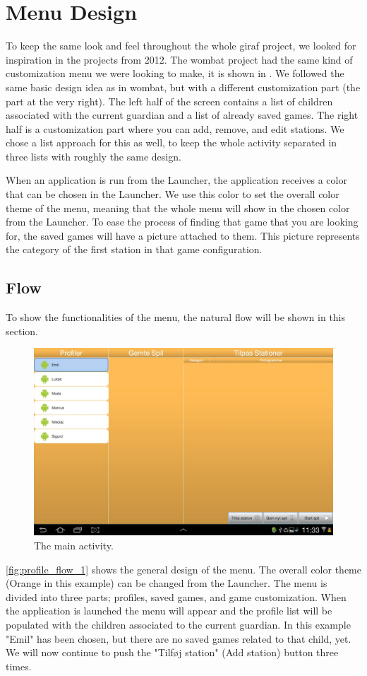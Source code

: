 \section{Menu Design}
\label{designmenu}
To keep the same look and feel throughout the whole \ac{giraf} project, we looked for inspiration in the projects from 2012. The \ac{wombat} project had the same kind of customization menu we were looking to make, it is shown in . We followed the same basic design idea as in \ac{wombat}, but with a different customization part (the part at the very right). The left half of the screen contains a list of children associated with the current guardian and a list of already saved games. The right half is a customization part where you can add, remove, and edit stations. We chose a list approach for this as well, to keep the whole activity separated in three lists with roughly the same design.

When an application is run from the Launcher, the application receives a color that can be chosen in the Launcher. We use this color to set the overall color theme of the menu, meaning that the whole menu will show in the chosen color from the Launcher.
To ease the process of finding that game that you are looking for, the saved games will have a picture attached to them. This picture represents the category of the first station in that game configuration.

\subsection{Flow}
To show the functionalities of the menu, the natural flow will be shown in this section.
\begin{figure}[H]
\centering
\includegraphics[width=1.0\linewidth]{img/screenshots/profile_flow_1.jpg}%
\caption{The main activity.}
\label{fig:profile_flow_1}
\end{figure}
\autoref{fig:profile_flow_1} shows the general design of the menu. The overall color theme (Orange in this example) can be changed from the Launcher. The menu is divided into three parts; profiles, saved games, and game customization. When the application is launched the menu will appear and the profile list will be populated with the children associated to the current guardian. In this example "Emil" has been chosen, but there are no saved games related to that child, yet.
We will now continue to push the "Tilføj station" (Add station) button three times.

